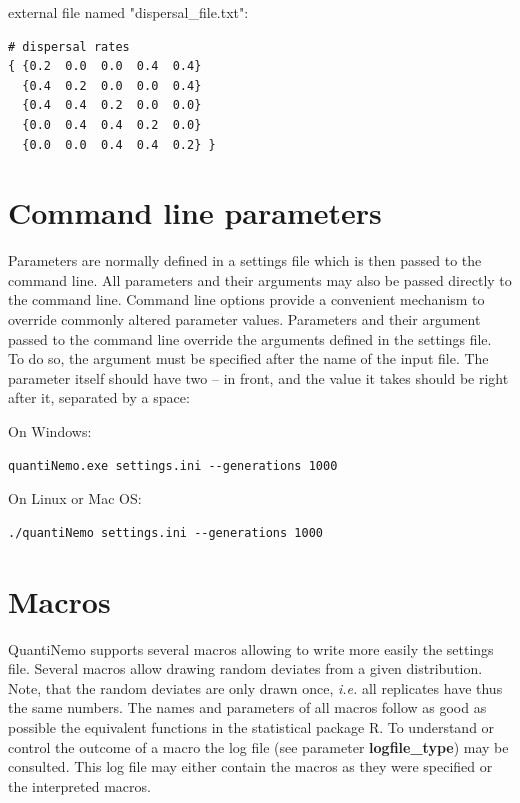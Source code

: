 \documentclass[letterpaper,12pt,oneside]{book}
\begin{document}
external file named "dispersal\_file.txt":
\begin{lstlisting}[frame=single]
# dispersal rates
{ {0.2  0.0  0.0  0.4  0.4}
  {0.4  0.2  0.0  0.0  0.4}
  {0.4  0.4  0.2  0.0  0.0}
  {0.0  0.4  0.4  0.2  0.0}
  {0.0  0.0  0.4  0.4  0.2} }
\end{lstlisting}

\section{Command line parameters}\label{sec:CommandLineParameters}
Parameters are normally defined in a settings file which is then passed to the command line. All parameters and their arguments may also be passed directly to the command line. Command line options provide a convenient mechanism to override commonly altered parameter values. Parameters and their argument passed to the command line override the arguments defined in the settings file. To do so, the argument must be specified after the name of the input file. The parameter itself should have two -- in front, and the value it takes should be right after it, separated by a space:   

On Windows:
\begin{lstlisting}[frame=single]
quantiNemo.exe settings.ini --generations 1000
\end{lstlisting}

On Linux or Mac OS:
\begin{lstlisting}[frame=single]
./quantiNemo settings.ini --generations 1000
\end{lstlisting}

\section{Macros}\label{macros}
QuantiNemo supports several macros allowing to write more easily the settings file. Several macros allow drawing random deviates from a given distribution. Note, that the random deviates are only drawn once, \textit{i.e.} all replicates have thus the same numbers. The names and parameters of all macros follow as good as possible the equivalent functions in the statistical package R. To understand or control the outcome of a macro the log file (see parameter \textbf{logfile\_type}) may be consulted. This log file may either contain the macros as they were specified or the interpreted macros.
\end{document}
